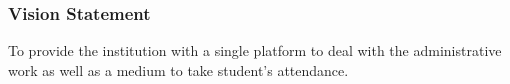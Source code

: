 \subsubsection{Vision Statement}
        \hspace{9mm} To provide the institution with a single platform to deal with the administrative work as well as a medium to take student's attendance.